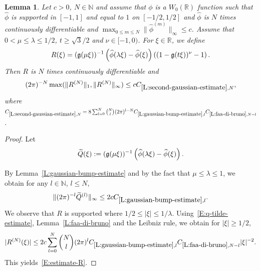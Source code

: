 \documentclass[12pt,reqno]{amsart}
\theoremstyle{plain}
\newtheorem{lemma}[theorem]{Lemma}
\numberwithin{equation}{section}
\theoremstyle{remark}
\newcommand{\using}[1]{}
\newcommand{\R}{{\mathbb R}}
\begin{document}
\begin{lemma}\label{L:second-gaussian-estimate}\using{L:gaussian-bump-estimate}\using{L:faa-di-bruno}
Let $c>0$, $N\in \mathbb N$ and assume that $\phi$ is a $W_0(\R)$ function such that
$\widehat{\phi}$ is supported in $[-1,1]$ and equal to $1$ on $[-1/2,1/2]$ and $\widehat{\phi}$ is $N$ times continuously differentiable and $\max_{0\leq m \leq N} \|\widehat{\phi}^{(m)}\|_{\infty} \leq c$.
Assume that $0<\mu \leq \lambda \leq 1/2$, $t\geq \sqrt{3}/2$ and $\nu \in [-1,0)$. For $\xi \in \R$, we define
\begin{equation}\label{auto:second-Gaussian-multiplier}
R(\xi)=(\mathfrak{g}(\mu\xi))^{-1}\left(\widehat{\phi}(\lambda\xi)-\widehat{\phi}(\xi)\right)\left((1-\mathfrak{g}(t\xi))^{\nu} -1\right).
\end{equation}
Then $R$ is $N$ times continuously differentiable and
\begin{equation}\label{E:estimate-R}
(2\pi)^{-N} \max(\|R^{(N)}\|_1,\|R^{(N)}\|_\infty) \leq cC_{\ref{L:second-gaussian-estimate},N},
\end{equation}
where $C_{\ref{L:second-gaussian-estimate},N}=8\sum_{l=0}^N \binom{N}{l} (2\pi)^{l-N} C_{\ref{L:gaussian-bump-estimate},l} C_{\ref{L:faa-di-bruno},N-l}$.

\end{lemma}


\begin{proof}
Let
\[
\widetilde{Q}(\xi):=(\mathfrak{g}(\mu\xi))^{-1}\left(\widehat{\phi}(\lambda\xi)-\widehat{\phi}(\xi)\right).
\]


By Lemma~\ref{L:gaussian-bump-estimate} and by the fact that $\mu \leq \lambda \leq 1$, we obtain for any $l\in \mathbb N$, $l\leq N$,
\begin{equation}\label{E:q-tilde-estimate}
\|(2\pi)^{-l}\widetilde{Q}^{(l)}\|_{\infty} \leq 2c C_{\ref{L:gaussian-bump-estimate},l}.
\end{equation}
We observe that $R$ is supported where $1/2\le|\xi|\le1/\lambda$.
Using~\eqref{E:q-tilde-estimate}, Lemma~\ref{L:faa-di-bruno} and the Leibniz rule, we obtain for $|\xi|\geq 1/2$,
\[
|R^{(N)}(\xi)| \leq 2c\sum_{l=0}^N \binom{N}{l} (2\pi)^l C_{\ref{L:gaussian-bump-estimate},l} C_{\ref{L:faa-di-bruno},N-l} |\xi|^{-2}.
\]
This yields~\eqref{E:estimate-R}.
\end{proof}
\end{document}
